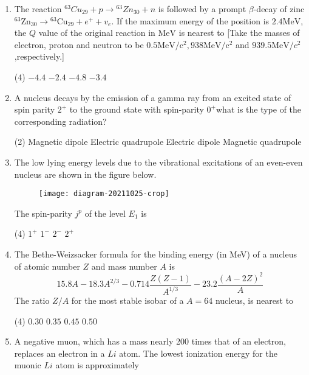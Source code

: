 \begin{enumerate}
	\item The reaction ${ }^{63} C u_{29}+p \rightarrow{ }^{63} Z n_{30}+n$ is followed by a prompt $\beta$-decay of zinc ${ }^{63} \mathrm{Zn}_{30} \rightarrow{ }^{63} \mathrm{Cu}_{29}+e^{+}+v_{e} .$ If the maximum energy of the position is $2.4 \mathrm{MeV}$, the $Q$ value of the original reaction in $\mathrm{MeV}$ is nearest to
	[Take the masses of electron, proton and neutron to be $0.5 \mathrm{MeV} / \mathrm{c}^{2}, 938 \mathrm{MeV} / \mathrm{c}^{2}$ and $939.5 \mathrm{MeV} / c^{2}$,respectively.]
	{	}
	\begin{tasks}(4)
		\task[\textbf{A.}] $-4.4$
		\task[\textbf{B.}] $-2.4$
		\task[\textbf{C.}] $-4.8$
		\task[\textbf{D.}] $-3.4$
	\end{tasks}
	\item A nucleus decays by the emission of a gamma ray from an excited state of spin parity $2^{+}$ to the ground state with spin-parity $0^{+}$what is the type of the corresponding radiation?
	{}
	\begin{tasks}(2)
		\task[\textbf{A.}] Magnetic dipole
		\task[\textbf{B.}] Electric quadrupole
		\task[\textbf{C.}]  Electric dipole
		\task[\textbf{D.}] Magnetic quadrupole
	\end{tasks}
	\item The low lying energy levels due to the vibrational excitations of an even-even nucleus are shown in the figure below.
	\begin{figure}[H]
		\centering
		\texttt{[image: diagram-20211025-crop]}
	\end{figure}
	The spin-parity $j^{p}$ of the level $E_{1}$ is
	{	}
	\begin{tasks}(4)
		\task[\textbf{A.}] $1^+$
		\task[\textbf{B.}] $1^-$
		\task[\textbf{C.}] $2^-$
		\task[\textbf{D.}] $2^+$ 
	\end{tasks}
	\item The Bethe-Weizsacker formula for the binding energy (in MeV) of a nucleus of atomic number $Z$ and mass number $A$ is
	$$
	15.8 A-18.3 A^{2 / 3}-0.714 \frac{Z(Z-1)}{A^{1 / 3}}-23.2 \frac{(A-2 Z)^{2}}{A}
	$$
	The ratio $Z / A$ for the most stable isobar of a $A=64$ nucleus, is nearest to
	{	}
	\begin{tasks}(4)
		\task[\textbf{A.}] $0.30$
		\task[\textbf{B.}] $0.35$
		\task[\textbf{C.}] $0.45$
		\task[\textbf{D.}] $0.50$
	\end{tasks}
	\item A negative muon, which has a mass nearly 200 times that of an electron, replaces an electron in a $L i$ atom. The lowest ionization energy for the muonic $L i$ atom is approximately

\end{enumerate}
